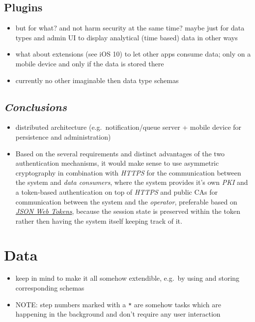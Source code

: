 \documentclass[12pt,english,a4paper,titlepage,cleardoublepage=empty,dottedtoc]{report}
\providecommand{\tightlist}{%
  \setlength{\itemsep}{0pt}\setlength{\parskip}{0pt}}
\begin{document}
\subsection{Plugins}\label{plugins}

\begin{itemize}
\tightlist
\item
  but for what? and not harm security at the same time? maybe just for
  data types and admin UI to display analytical (time based) data in
  other ways
\item
  what about extensions (see iOS 10) to let other apps consume data;
  only on a mobile device and only if the data is stored there
\item
  currently no other imaginable then data type schemas
\end{itemize}

\subsection{\texorpdfstring{\emph{Conclusions}}{Conclusions}}\label{conclusions}

\begin{itemize}
\item
  distributed architecture (e.g.~notification/queue server + mobile
  device for persistence and administration)
\item
  Based on the several requirements and distinct advantages of the two
  authentication mechanisms, it would make sense to use asymmetric
  cryptography in combination with \emph{HTTPS} for the communication
  between the system and \emph{data consumers}, where the system
  provides it's own \emph{PKI} and a token-based authentication on top
  of \emph{HTTPS} and public CAs for communication between the system
  and the \emph{operator}, preferable based on
  \emph{\protect\hyperlink{link_jwt}{JSON Web Tokens}}, because the
  session state is preserved within the token rather then having the
  system itself keeping track of it.
\end{itemize}

\section{Data}\label{data}

\begin{itemize}
\item
  keep in mind to make it all somehow extendible, e.g.~by using and
  storing corresponding schemas
\item
  NOTE: step numbers marked with a \texttt{*} are somehow tasks which
  are happening in the background and don't require any user interaction
\end{itemize}
\end{document}
